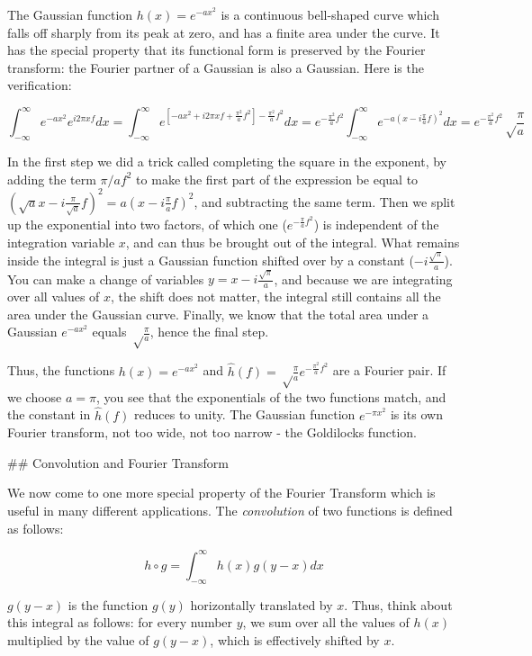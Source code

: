 The Gaussian function $h(x)= e^{-ax^2}$ is a continuous bell-shaped curve which falls off sharply from its peak at zero, and has a finite area under the curve. It has the special property that its functional form is preserved by the Fourier transform: the Fourier partner of a Gaussian is also a Gaussian. Here is the verification:

$$
\int_{-\infty} ^\infty e^{-ax^2} e^{i2\pi xf} dx = \int_{-\infty} ^\infty e^{[-ax^2+i2\pi xf +\frac{\pi^2}{a}f^2] - \frac{\pi^2}{a}f^2}dx = e^{- \frac{\pi^2}{a}f^2} \int_{-\infty} ^\infty e^{-a(x-i\frac{\pi}{a}f)^2}dx = e^{- \frac{\pi^2}{a}f^2}  \sqrt\frac{\pi}{a}
$$

In the first step we did a trick called completing the square in the exponent, by adding the term $\pi/a f^2$ to make the first part of the expression be equal to $(\sqrt{a}x-i\frac{\pi}{\sqrt{a}}f)^2=a(x-i\frac{\pi}{a}f)^2$, and subtracting the same term. Then we split up the exponential into two factors, of which one ($e^{- \frac{\pi}{a}f^2}$)  is independent of the integration variable $x$, and can thus be brought out of the integral. What remains inside the integral is just a Gaussian function shifted over by a constant ($-i\frac{\sqrt\pi}{a}$). You can make a change of variables $y=x-i\frac{\sqrt\pi}{a}$, and because we are integrating over all values of $x$, the shift does not matter, the integral still contains all the area under the Gaussian curve. Finally, we know that the total area under a Gaussian $ e^{-ax^2}$ equals $\sqrt\frac{\pi}{a}$, hence the final step. 

Thus, the functions  $h(x)= e^{-ax^2}$  and $\widehat h(f) = \sqrt\frac{\pi}{a} e^{- \frac{\pi^2}{a}f^2}$ are a Fourier pair. If we choose $a = \pi$, you see that the exponentials of the two functions match, and the constant in $\widehat h(f)$ reduces to unity. The Gaussian function $ e^{-\pi x^2}$ is its own Fourier transform, not too wide, not too narrow - the Goldilocks function.

## Convolution and Fourier Transform

We now come to one more special property of the Fourier Transform which is useful in many different applications. The \emph{convolution} of two functions is defined as follows:

$$ h\circ g = \int _{-\infty} ^\infty h(x) g(y-x) dx $$ 

$g(y-x)$ is the function $g(y)$ horizontally translated by $x$. Thus, think about this integral as follows: for every number $y$, we sum over all the values of $h(x)$ multiplied by the value of $g(y-x)$, which is effectively shifted by $x$. 

